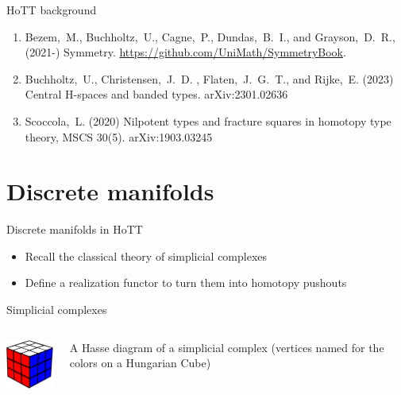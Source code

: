 \documentclass[14pt,aspectratio=169]{beamer}
\begin{document}
\begin{frame}{HoTT background}
\begin{enumerate}
\item Bezem,~M., Buchholtz,~U., Cagne,~P., Dundas,~B.~I., and Grayson,~D.~R.,
  (2021-) Symmetry. \url{https://github.com/UniMath/SymmetryBook}.

\item Buchholtz,~U., Christensen,~J.~D. , Flaten,~J.~G.~T., and Rijke,~E. (2023) Central
  H-spaces and banded types. arXiv:2301.02636

\item Scoccola,~L. (2020) Nilpotent types and fracture squares in homotopy type theory, MSCS 30(5). arXiv:1903.03245
\end{enumerate}
\end{frame}

\section{Discrete manifolds}

\begin{frame}{Discrete manifolds in HoTT}
\begin{itemize}
\item Recall the classical theory of \alert{simplicial complexes}
\item Define a \alert{realization} functor to turn them into homotopy pushouts
\end{itemize}
\end{frame}

\begin{frame}{Simplicial complexes}
\begin{columns}
\begin{column}{0.5\textwidth}
\!\!\!\!\!\vspace{-0.5cm}\resizebox{220pt}{!}{
\begin{tikzpicture}[scale=0.1]

\end{tikzpicture}%
}
\resizebox{90pt}{!}{%

}
\quad
\includegraphics[width=60pt]{figs/hungarian_cube.pdf}
\end{column}
\begin{column}{0.5\textwidth}
A \alert{Hasse diagram} of a simplicial complex (vertices named for the colors on a Hungarian Cube)
\end{column}
\end{columns}
\end{frame}
\end{document}
